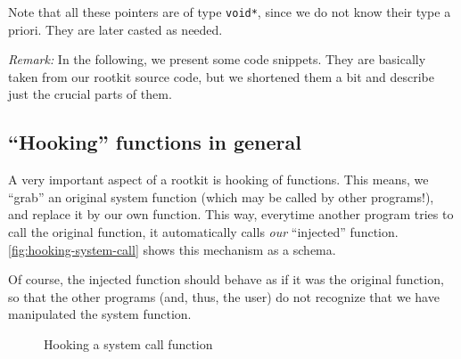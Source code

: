 \documentclass[10pt, letterpaper]{scrartcl}
\begin{document}
Note that all these pointers are of type \texttt{void*}, since we do not know their type a priori. They are later casted as needed.

\emph{Remark:} In the following, we present some code snippets. They are basically taken from our rootkit source code, but we shortened them a bit and describe just the crucial parts of them.

\subsection{``Hooking'' functions in general}
\label{sec:hooking_general}
A very important aspect of a rootkit is hooking of functions. This means, we ``grab'' an original system function (which may be called by other programs!), and replace it by our own function. This way, everytime another program tries to call the original function, it automatically calls \emph{our} ``injected'' function. \autoref{fig:hooking-system-call} shows this mechanism as a schema.

Of course, the injected function should behave as if it was the original function, so that the other programs (and, thus, the user) do not recognize that we have manipulated the system function.

\begin{figure}[ht]
  \centering
  \caption{Hooking a system call function}
  \label{fig:hooking-system-call}
\end{figure}
\end{document}
